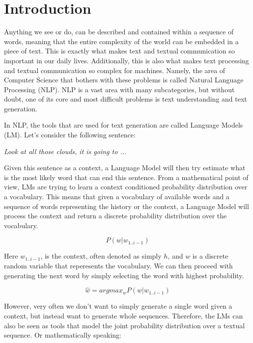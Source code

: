 \chapter{Introduction}

Anything we see or do, can be described and contained within a sequence of words, meaning that the entire complexity of the world can be embedded in a piece of text. This is exactly what makes text and textual communication so important in our daily lives. Additionally, this is also what makes text processing and textual communication so complex for machines. Namely, the area of Computer Science that bothers with these problems is called Natural Language Processing (NLP). NLP is a vast area with many subcategories, but without doubt, one of its core and most difficult problems is text understanding and text generation.

In NLP, the tools that are used for text generation are called Language Models (LM). Let's consider the following sentence:

\begin{center}
    \emph{Look at all those clouds, it is going to ...}
\end{center}

Given this sentence as a context, a Language Model will then try estimate what is the most likely word that can end this sentence. From a mathematical point of view, LMs are trying to learn a context conditioned probability distribution over a vocabulary. This means that given a vocabulary of available words and a sequence of words representing the history or the context, a Language Model will process the context and return a discrete probability distribution over the vocabulary. 

\begin{displaymath}
    P(w | w_{1..i-1})
\end{displaymath}

Here $w_{1..i-1}$, is the context, often denoted as simply $h$, and $w$ is a discrete random variable that reperesents the vocabulary. We can then proceed with generating the next word by simply selecting the word with highest probability.

\begin{displaymath}
    \hat{w} = argmax_w P(w | w_{1..i-1})
\end{displaymath}

However, very often we don't want to simply generate a single word given a context, but instead want to generate whole sequences. Therefore, the LMs can also be seen as tools that model the joint probability distribution over a textual sequence. Or mathematically speaking:

